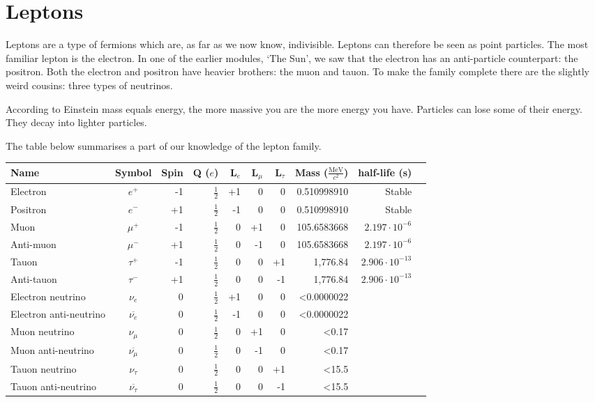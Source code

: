 \section{Leptons}
Leptons are a type of fermions which are, as far as we now know, indivisible. Leptons can therefore be seen as point particles. The most familiar lepton is the electron. In one of the earlier modules, `The Sun', we saw that the electron has an anti-particle counterpart: the positron. Both the electron and positron have heavier brothers: the muon and tauon. To make the family complete there are the slightly weird cousins: three types of neutrinos.

According to Einstein mass equals energy, the more massive you are the more energy you have. Particles can lose some of their energy. They decay into lighter particles.

The table below summarises a part of our knowledge of the lepton family.

\begin{center}\begin{small}
\begin{tabular}[h]{l c r r r r r r r r} 
Name & Symbol & Spin & Q ($e$) & L$_e$ & L$_{\mu}$  & L$_{\tau}$  & Mass ($\frac{\mbox{MeV}}{c^2}$) & half-life (s) \\ \hline \hline
Electron & $e^+$ & -1 & $\frac{1}{2}$ & +1 & 0 & 0 & 0.510998910 & Stable \\ 
Positron & $e^-$ & +1 & $\frac{1}{2}$ & -1 & 0 & 0 & 0.510998910 & Stable \\ \hline
Muon & $\mu^+$ & -1 & $\frac{1}{2}$ & 0 & +1 & 0 & 105.6583668 &  $2.197 \cdot 10^{-6}$ \\ 
Anti-muon & $\mu^-$ & +1 & $\frac{1}{2}$ & 0 & -1 & 0 & 105.6583668 & $2.197 \cdot 10^{-6}$ \\ \hline
Tauon & $\tau^+$ & -1 & $\frac{1}{2}$ & 0 & 0 & +1 & 1,776.84 & $2.906 \cdot 10^{-13}$ \\ 
Anti-tauon & $\tau^-$ & +1 & $\frac{1}{2}$ & 0 & 0 & -1 & 1,776.84 &  $2.906 \cdot 10^{-13}$ \\ \hline
Electron neutrino & $\nu_e$ & 0 & $\frac{1}{2}$ & +1 & 0 & 0 & \textless 0.0000022 &  \\ 
Electron anti-neutrino & $\overline{\nu_e}$ & 0 & $\frac{1}{2}$ & -1 & 0 & 0 & \textless 0.0000022 &  \\ \hline
Muon neutrino & $\nu_{\mu}$ & 0 & $\frac{1}{2}$ & 0 & +1 & 0 & \textless 0.17 &  \\ 
Muon anti-neutrino & $\overline{\nu_{\mu}}$ & 0 & $\frac{1}{2}$ & 0 & -1 & 0 & \textless 0.17 &  \\ \hline
Tauon neutrino & $\nu_{\tau}$ & 0 & $\frac{1}{2}$ & 0 & 0 & +1 & \textless 15.5 &  \\ 
Tauon anti-neutrino & $\overline{\nu_{\tau}}$ & 0 & $\frac{1}{2}$ & 0 & 0 & -1 & \textless 15.5 &  \\ \hline
\end{tabular}\end{small}
\label{tab:leptons}
\end{center}

